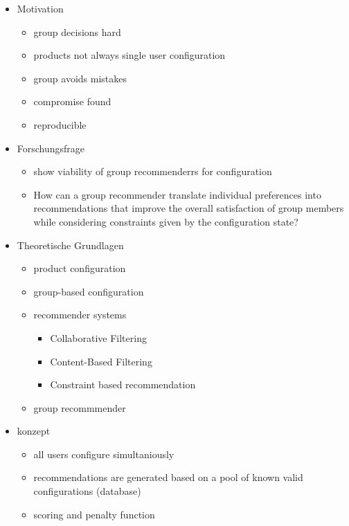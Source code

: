 \begin{itemize}
    \item Motivation
        \begin{itemize}
            \item group decisions hard
            \item products not always single user configuration
            \item group avoids mistakes
            \item compromise found
            \item reproducible
        \end{itemize}
    \item Forschungsfrage
        \begin{itemize}
            \item show viability of group recommenderrs for configuration
            \item How can a group recommender translate individual preferences into recommendations that improve the overall satisfaction of group members while considering constraints given by the configuration state?
        \end{itemize}
    \item Theoretische Grundlagen
        \begin{itemize}
            \item product configuration
            \item group-based configuration
            \item recommender systems
                \begin{itemize}
                    \item Collaborative Filtering
                    \item Content-Based Filtering 
                    \item Constraint based recommendation
                \end{itemize}
            \item group recommmender
        \end{itemize}
    \item konzept
        \begin{itemize}
            \item all users configure simultaniously
            \item recommendations are generated based on a pool of known valid configurations (database)
            \item scoring and penalty function

\end{itemize}
\end{itemize}
